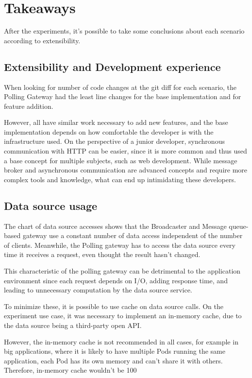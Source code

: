 \section{Takeaways}
\label{sec:providerconclusion}

After the experiments, it's possible to take some conclusions about each scenario according to extensibility.

\subsection*{Extensibility and Development experience}
\label{sec:devex}

When looking for number of code changes at the git diff for each scenario, the Polling Gateway had the least line changes for the base implementation and for feature addition.

However, all have similar work necessary to add new features, and the base implementation depends on how comfortable the developer is with the infrastructure used. On the perspective of a junior developer, synchronous communication with HTTP can be easier, since it is more common and thus used a base concept for multiple subjects, such as web development. While message broker and asynchronous communication are advanced concepts and require more complex tools and knowledge, what can end up intimidating these developers.

\subsection*{Data source usage}
\label{sec:source}

The chart of data source accesses shows that the Broadcaster and Message queue-based gateway use a constant number of data access independent of the number of clients. Meanwhile, the Polling gateway has to access the data source every time it receives a request, even thought the result hasn’t changed.

This characteristic of the polling gateway can be detrimental to the application environment since each request depends on I/O, adding response time, and leading to unnecessary computation by the data source service.

To minimize these, it is possible to use cache on data source calls. On the experiment use case, it was necessary to implement an in-memory cache, due to the data source being a third-party open API. 

However, the in-memory cache is not recommended in all cases, for example in big applications, where it is likely to have multiple Pods running the same application, each Pod has its own memory and can't share it with others. Therefore, in-memory cache wouldn't be 100%


